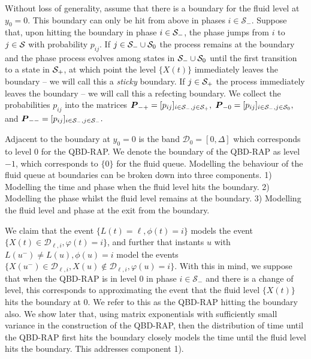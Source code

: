 Without loss of generality, assume that there is a boundary for the fluid level at \(y_0 = 0\). This boundary can only be hit from above in phases \(i\in\mathcal S_-\). %
Suppose that, upon hitting the boundary in phase \(i\in\mathcal{S}_-\), the phase jumps from \(i\) to \(j\in\mathcal{S}\) with probability \(p_{ij}\). If \(j\in\mathcal{S}_-\cup\mathcal{S}_0\) the process remains at the boundary and the phase process evolves among states in \(\mathcal{S}_-\cup\mathcal{S}_0\) until the first transition to a state in \(\mathcal{S}_+\), at which point the level \(\{X(t)\}\) immediately leaves the boundary -- we will call this a \emph{sticky} boundary. If \(j\in\mathcal{S}_+\) the process immediately leaves the boundary -- we will call this a refecting boundary. 
We collect the probabilities \(p_{ij}\) into the matrices \(\boldsymbol P_{-+} = [p_{ij}]_{i\in\mathcal{S}_-,j\in\mathcal{S}_+},\) \(\boldsymbol P_{-0} = [p_{ij}]_{i\in\mathcal{S}_-,j\in\mathcal{S}_0},\) and \(\boldsymbol P_{--} = [p_{ij}]_{i\in\mathcal{S}_-,j\in\mathcal{S}_-}.\)

Adjacent to the boundary at \(y_0=0\) is the band \(\mathcal D_0=[0,\Delta]\) which corresponds to level \(0\) for the QBD-RAP. We denote the boundary of the QBD-RAP as level \(-1\), which corresponds to \(\{0\}\) for the fluid queue. Modelling the behaviour of the fluid queue at boundaries can be broken down into three components. 1) Modelling the time and phase when the fluid level hits the boundary. 2) Modelling the phase whilst the fluid level remains at the boundary. 3) Modelling the fluid level and phase at the exit from the boundary. 

We claim that the event \(\{L(t)=\ell,\phi(t)=i\}\) models the event \(\{X(t)\in\mathcal D_{\ell,i},\varphi(t)=i\}\), and further that instants \(u\) with \(L(u^-)\neq L(u), \phi(u)=i\) model the events \(\{X(u^-)\in \mathcal D_{\ell,i}, X(u)\notin\mathcal D_{\ell,i},\varphi(u)=i\}\). With this in mind, we suppose that when the QBD-RAP is in level \(0\) in phase \(i\in\mathcal S_-\) and there is a change of level, this corresponds to approximating the event that the fluid level \(\{X(t)\}\) hits the boundary at \(0\). We refer to this as the QBD-RAP hitting the boundary also. We show later that, using matrix exponentials with sufficiently small variance in the construction of the QBD-RAP, then the distribution of time until the QBD-RAP first hits the boundary closely models the time until the fluid level hits the boundary. This addresses component 1). 

